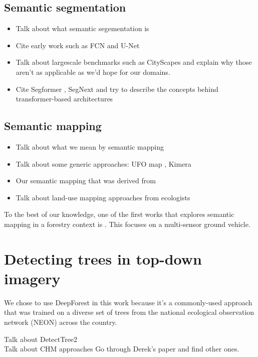 \subsection{Semantic segmentation}
\begin{itemize}
    \item Talk about what semantic segementation is
    \item Cite early work such as FCN and U-Net
    \item Talk about largescale benchmarks such as CityScapes and explain why those aren't as applicable as we'd hope for our domains.
    \item Cite Segformer \cite{Xie2021}, SegNext \cite{Guo2022SegNeXt:Segmentation} and try to describe the concepts behind transformer-based architectures
\end{itemize}
\subsection{Semantic mapping}

\begin{itemize}
    \item Talk about what we mean by semantic mapping 
    \item Talk about some generic approaches: UFO map \cite{Duberg2020UFOMap:Unknown}, Kimera \cite{Rosinol2020}
    \item Our semantic mapping \cite{RussellUnmannedMitigation} that was derived from \cite{semantic_slam_RGBD}
    \item Talk about land-use mapping approaches from ecologists \cite{Liu2018DeepClassification} 
\end{itemize}


To the best of our knowledge, one of the first works that explores semantic mapping in a forestry context is \cite{Andrada2022IntegrationRoboticsb}. This focuses on a multi-sensor ground vehicle.

\section{Detecting trees in top-down imagery}
We chose to use DeepForest \cite{Weinstein2020DeepForest:Delineation} in this work because it's a commonly-used approach that was trained on a diverse set of trees from the national ecological observation network (NEON) \cite{Keller2008ANetwork} across the country.

Talk about DetectTree2 \cite{DetectTree2} \\
Talk about CHM approaches
Go through Derek's paper and find other ones.

